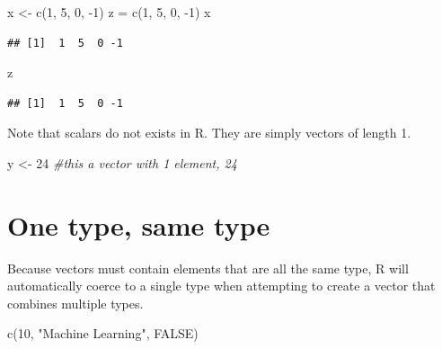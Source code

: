 \documentclass[
]{book}
\newenvironment{Shaded}{\begin{snugshade}}{\end{snugshade}}
\newcommand{\CommentTok}[1]{\textcolor[rgb]{0.56,0.35,0.01}{\textit{#1}}}
\newcommand{\ConstantTok}[1]{\textcolor[rgb]{0.00,0.00,0.00}{#1}}
\newcommand{\DecValTok}[1]{\textcolor[rgb]{0.00,0.00,0.81}{#1}}
\newcommand{\FunctionTok}[1]{\textcolor[rgb]{0.00,0.00,0.00}{#1}}
\newcommand{\NormalTok}[1]{#1}
\newcommand{\OtherTok}[1]{\textcolor[rgb]{0.56,0.35,0.01}{#1}}
\newcommand{\SpecialCharTok}[1]{\textcolor[rgb]{0.00,0.00,0.00}{#1}}
\newcommand{\StringTok}[1]{\textcolor[rgb]{0.31,0.60,0.02}{#1}}
\theoremstyle{definition}
\theoremstyle{definition}
\theoremstyle{definition}
\theoremstyle{definition}
\theoremstyle{remark}
\begin{document}
\begin{Shaded}
\begin{Highlighting}[]
\NormalTok{x }\OtherTok{\textless{}{-}} \FunctionTok{c}\NormalTok{(}\DecValTok{1}\NormalTok{, }\DecValTok{5}\NormalTok{, }\DecValTok{0}\NormalTok{, }\SpecialCharTok{{-}}\DecValTok{1}\NormalTok{)}
\NormalTok{z }\OtherTok{=} \FunctionTok{c}\NormalTok{(}\DecValTok{1}\NormalTok{, }\DecValTok{5}\NormalTok{, }\DecValTok{0}\NormalTok{, }\SpecialCharTok{{-}}\DecValTok{1}\NormalTok{)}
\NormalTok{x}
\end{Highlighting}
\end{Shaded}

\begin{verbatim}
## [1]  1  5  0 -1
\end{verbatim}

\begin{Shaded}
\begin{Highlighting}[]
\NormalTok{z}
\end{Highlighting}
\end{Shaded}

\begin{verbatim}
## [1]  1  5  0 -1
\end{verbatim}

Note that scalars do not exists in R. They are simply vectors of length 1.

\begin{Shaded}
\begin{Highlighting}[]
\NormalTok{y }\OtherTok{\textless{}{-}} \DecValTok{24}  \CommentTok{\#this a vector with 1 element, 24}
\end{Highlighting}
\end{Shaded}

\hypertarget{one-type-same-type}{%
\section{One type, same type}\label{one-type-same-type}}

Because vectors must contain elements that are all the same type, R will automatically coerce to a single type when attempting to create a vector that combines multiple types.

\begin{Shaded}
\begin{Highlighting}[]
\FunctionTok{c}\NormalTok{(}\DecValTok{10}\NormalTok{, }\StringTok{"Machine Learning"}\NormalTok{, }\ConstantTok{FALSE}\NormalTok{)}
\end{Highlighting}
\end{Shaded}
\end{document}
